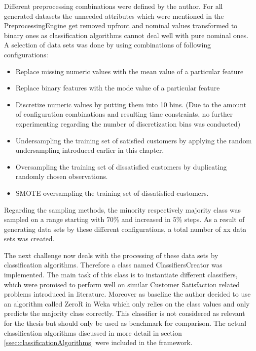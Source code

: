 Different preprocessing combinations were defined by the author. For all generated datasets the unneeded attributes which were mentioned in the PreprocessingEngine get removed upfront and nominal values transformed to binary ones as classification algorithms cannot deal well with pure nominal ones. A selection of data sets was done by using combinations of following configurations:

\begin{itemize}
	\item Replace missing numeric values with the mean value of a particular feature 
	\item Replace binary features with the mode value of a particular feature
	\item Discretize numeric values by putting them into 10 bins. (Due to the amount of configuration combinations and resulting time constraints, no further experimenting regarding the number of discretization bins was conducted)
	\item Undersampling the training set of satisfied customers by applying the random undersampling introduced earlier in this chapter.
	\item Oversampling the training set of dissatisfied customers by duplicating randomly chosen observations.
	\item SMOTE oversampling the training set of dissatisfied customers.
\end{itemize}

Regarding the sampling methods, the minority respectively majority class was sampled on a range starting with 70\% and increased in 5\% steps. As a result of generating data sets by these different configurations, a total number of xx data sets was created. 

The next challenge now deals with the processing of these data sets by classification algorithms. Therefore a class named ClassifiersCreator was implemented. The main task of this class is to instantiate different classifiers, which were promised to perform well on similar Customer Satisfaction related problems introduced in literature. Moreover as baseline the author decided to use an algorithm called ZeroR in Weka which only relies on the class values and only predicts the majority class correctly. This classifier is not considered as relevant for the thesis but should only be used as benchmark for comparison. The actual classification algorithms discussed in more detail in section \ref{ssec:classificationAlgorithms} were included in the framework. 

